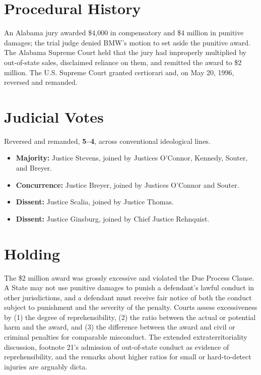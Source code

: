 \documentclass[12pt]{article}
\begin{document}
\section{Procedural History}

An Alabama jury awarded \$4,000 in compensatory and \$4 million in punitive damages; the trial judge denied BMW's motion to set aside the punitive award. The Alabama Supreme Court held that the jury had improperly multiplied by out-of-state sales, disclaimed reliance on them, and remitted the award to \$2 million. The U.S. Supreme Court granted certiorari and, on May 20, 1996, reversed and remanded.

\section{Judicial Votes}

Reversed and remanded, \textbf{5--4}, across conventional ideological lines.
\begin{itemize}
\item \textbf{Majority:} Justice Stevens, joined by Justices O'Connor, Kennedy, Souter, and Breyer.
\item \textbf{Concurrence:} Justice Breyer, joined by Justices O'Connor and Souter.
\item \textbf{Dissent:} Justice Scalia, joined by Justice Thomas.
\item \textbf{Dissent:} Justice Ginsburg, joined by Chief Justice Rehnquist.
\end{itemize}

\section{Holding}

The \$2 million award was grossly excessive and violated the Due Process Clause. A State may not use punitive damages to punish a defendant's lawful conduct in other jurisdictions, and a defendant must receive fair notice of both the conduct subject to punishment and the severity of the penalty. Courts assess excessiveness by (1) the degree of reprehensibility, (2) the ratio between the actual or potential harm and the award, and (3) the difference between the award and civil or criminal penalties for comparable misconduct. The extended extraterritoriality discussion, footnote 21's admission of out-of-state conduct as evidence of reprehensibility, and the remarks about higher ratios for small or hard-to-detect injuries are arguably dicta.
\end{document}
